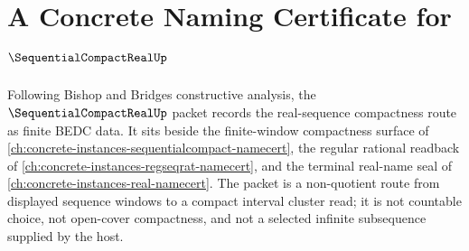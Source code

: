 \chapter{A Concrete Naming Certificate for $\SequentialCompactRealUp$}
\label{ch:concrete-instances-sequential-compact-real-namecert}

Following Bishop and Bridges constructive analysis, the $\SequentialCompactRealUp$ packet records the real-sequence compactness route as finite BEDC data. It sits beside the finite-window compactness surface of \autoref{ch:concrete-instances-sequentialcompact-namecert}, the regular rational readback of \autoref{ch:concrete-instances-regseqrat-namecert}, and the terminal real-name seal of \autoref{ch:concrete-instances-real-namecert}. The packet is a non-quotient route from displayed sequence windows to a compact interval cluster read; it is not countable choice, not open-cover compactness, and not a selected infinite subsequence supplied by the host.

